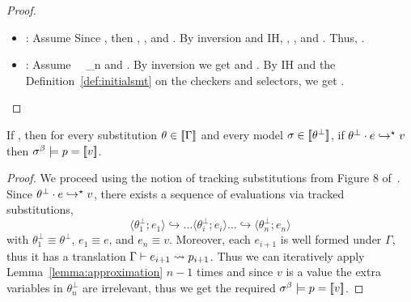 \begin{proof}
\begin{itemize}
\item \lgcaseBool : 
Assume
	 {}{\embed{\typ}}{\smtenv}{}
Since 
  , then 
  , 
  , and
  .
%  
By inversion and IH, 
  \smthastype{\smtenvinit, \embed{\env}}{\pred}{\tbool}, 
  , and
  .
Thus, 
  .

\item \lgcase : 
Assume 
	 { \ \ \pred_n}{\embed{\typ}}{\smtenv}
	 {} and
	 .
By inversion we get 
	 and
	.
By IH and the Definition~\ref{def:initialsmt} on the checkers and selectors, we get
  .
\end{itemize}
\end{proof}


\newcommand\tsub[1]{\ensuremath{{\theta_{#1}^\perp}}\xspace}
\newcommand\track[2]{\ensuremath{\langle #1; #2\rangle}\xspace}
\begin{theorem}\label{thm:approximation}
If ,
then for every substitution $\theta\in[\![\Gamma]\!]$
and every model $\sigma\in[\![\theta^\perp]\!]$,
if ${{\theta^\perp} \cdot {\ensuremath{e}} }\hookrightarrow^{\star}{v}$ then $\sigma^\beta \models p = [\![v]\!]$.
\end{theorem}
\begin{proof}
We proceed using the notion of tracking substitutions from Figure 8 of~\citep{Vazou14-tech}. 
Since ${{\theta^\perp} \cdot {\ensuremath{e}} }\hookrightarrow^{\star}{v}$, 
there exists a sequence of evaluations via tracked substitutions, 
$$
\track{\tsub{1}}{e_1} \hookrightarrow \dots \track{\tsub{i}}{e_i} \dots \hookrightarrow \track{\tsub{n}}{e_n}
$$
with $\tsub{1}\equiv\tsub{}$, $e_1\equiv e$, and $e_n\equiv v$. 
Moreover, each $e_{i+1}$ is well formed under $\Gamma$, 
thus it has a translation 
$ \Gamma\vdash e_{i+1} \rightsquigarrow p_{i+1} $. 
%
Thus we can iteratively apply Lemma~\ref{lemma:approximation} $n-1$ times and 
since $v$ is a value the extra variables in $\tsub{n}$ are irrelevant, thus we
get the required
$\sigma^\beta \models p = [\![v]\!]$. 
\end{proof}

